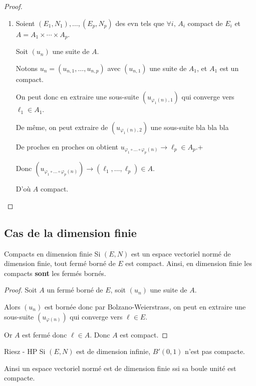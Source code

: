 \begin{proof}
\begin{enumerate}
        Or $\forall n \in \N, \, N(u_{\varphi(n)} - a) > \varepsilon$, 
        donc à la limite $0 \geqslant \varepsilon$, absurde.

        \item Soient $(E_1, N_1), \ldots, (E_p, N_p)$ des evn tels que 
        $\forall i, \, A_i$ compact de $E_i$ et $A = A_1 \times \cdots \times A_p$. 

        Soit $(u_n)$ une suite de $A$.

        Notons $u_n = (u_{n, 1}, \ldots, u_{n, p})$ avec $(u_{n, 1})$ une suite de $A_1$, et $A_1$ est un compact. 

        On peut donc en extraire une sous-suite $(u_{\varphi_1(n), 1})$ qui converge vers $\ell_1 \in A_1$.

        De même, on peut extraire de $(u_{\varphi_1(n), 2})$ une sous-suite bla bla bla 

        De proches en proches on obtient $u_{\varphi_1 \circ \ldots \circ \varphi_p(n)} \to \ell_p \in A_p$.+

        Donc $(u_{\varphi_1 \circ \ldots \circ \varphi_p(n)}) \to (\ell_1, \ldots, \ell_p) \in A$.

        D'où $A$ compact. 
    \end{enumerate}
\end{proof}

\subsection{Cas de la dimension finie}

\begin{theoreme}{Compacts en dimension finie}{}
    Si $(E, N)$ est un espace vectoriel normé de dimension finie, tout fermé borné de $E$ est compact. Ainsi, en 
    dimension finie les compacts \textbf{sont} les fermés bornés. 
\end{theoreme}


\begin{proof}
    Soit $A$ un fermé borné de $E$, soit $(u_n)$ une suite de $A$.

    Alors $(u_n)$ est bornée donc par Bolzano-Weierstrass, on peut en extraire une
    sous-suite $(u_{\varphi(n)})$ qui converge vers $\ell \in E$.

    Or $A$ est fermé donc $\ell \in A$. Donc $A$ est compact.
\end{proof}

\begin{theoreme}{Riesz - HP}{}
    Si $(E, N)$ est de dimension infinie, $B'(0, 1)$ n'est pas compacte. 

    Ainsi un espace vectoriel normé est de dimension finie ssi sa boule unité est compacte. 
\end{theoreme}

